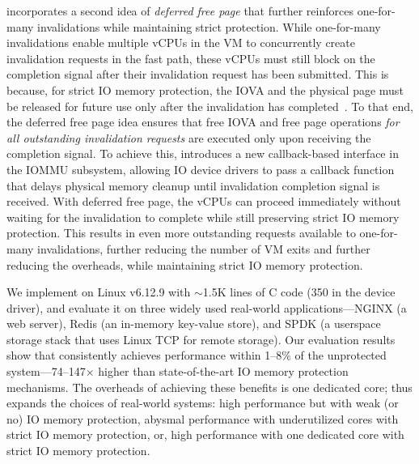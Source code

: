 {\name} incorporates a second idea of \textit{deferred free page} that further reinforces one-for-many invalidations while maintaining strict protection. While one-for-many invalidations enable multiple vCPUs in the VM to concurrently create invalidation requests in the fast path, these vCPUs must still block on the completion signal after their invalidation request has been submitted. This is because, for strict IO memory protection, the IOVA and the physical page must be released for future use only after the invalidation has completed~\cite{Amit2011vIOMMU, malka2015efficient, Markuze2016true, markuze2018damn, RajapakshaIOMMU}. To that end, the deferred free page idea ensures that free IOVA and free page operations \textit{for all outstanding invalidation requests} are executed only upon receiving the completion signal. To achieve this, {\name} introduces a new callback-based interface in the IOMMU subsystem, allowing IO device drivers to pass a callback function that delays physical memory cleanup until invalidation completion signal is received. With deferred free page, the vCPUs can proceed immediately without waiting for the invalidation to complete while still preserving strict IO memory protection. This results in even more outstanding requests available to one-for-many invalidations, further reducing the number of VM exits and further reducing the overheads, while maintaining strict IO memory protection. 

We implement \brand on Linux v6.12.9 with $\sim$1.5K lines of C code (350 in the device driver), 
    and evaluate it on three widely used real-world applications---NGINX (a web server), 
    Redis (an in-memory key-value store), and SPDK (a userspace storage stack that uses Linux TCP for remote storage). 
Our evaluation results show that {\name} consistently achieves performance within 1--8$\%$ 
    of the unprotected system---74--147$\times$ higher than state-of-the-art IO memory protection mechanisms. 
    The overheads of achieving these benefits is one dedicated core; 
    {\name} thus expands the choices of real-world systems: high performance 
    but with weak (or no) IO memory protection, abysmal performance with underutilized cores with strict IO memory protection, 
    or, high performance with one dedicated core with strict IO memory protection. 
